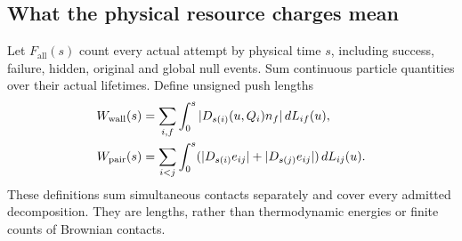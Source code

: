 \documentclass[11pt]{article}
\numberwithin{equation}{section}
\theoremstyle{definition}
\theoremstyle{remark}\newtheorem{remark}[theorem]{Remark}
\newcommand{\Ff}{F_{\mathrm{all}}}
\newcommand{\dd}{\,d}
\begin{document}
\subsection{What the physical resource charges mean}

Let $\Ff(s)$ count every actual attempt by physical time $s$, including
success, failure, hidden, original and global null events. Sum continuous
particle quantities over their actual lifetimes. Define unsigned push
lengths
\begin{align}
 W_{\rm wall}(s)&=\sum_{i,f}\int_0^s|D_{s(i)}(u,Q_i)n_f|\dd L_{if}(u),
 \nonumber\\
 W_{\rm pair}(s)&=\sum_{i<j}\int_0^s
    (|D_{s(i)}e_{ij}|+|D_{s(j)}e_{ij}|)\dd L_{ij}(u).
    \label{eq:workdefs}
\end{align}
These definitions sum simultaneous contacts separately and cover every
admitted decomposition. They are lengths, rather than thermodynamic
energies or finite counts of Brownian contacts.
\end{document}
